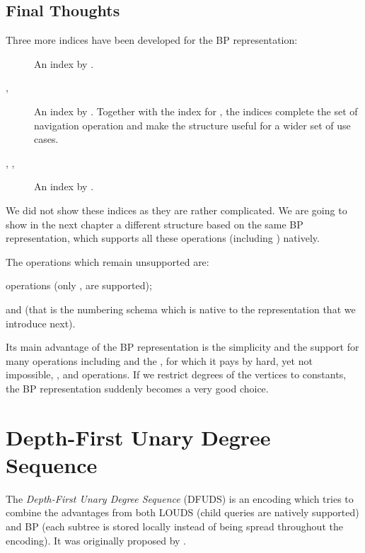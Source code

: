 \subsection{Final Thoughts}

Three more indices have been developed for the BP representation:
\begin{description}
	\item[\degree{}]
	An index by \cite{chiang2005orderly}.

	\item[\childRank{}, \childSelect{}]
	An index by \cite{lu2008balanced}.
	Together with the index for \degree{}, the indices complete the set of navigation operation and make the structure useful for a wider set of use cases.

	\item[\levelAncestor{}, \levelPrev{}, \levelNext{}]
	An index by \cite{munro2012succinct}.
\end{description}
We did not show these indices as they are rather complicated.
We are going to show in the next chapter a different structure based on the same BP representation, which supports all these operations (including \levelAny{}) natively.

The operations which remain unsupported are:
\begin{iteminline}
	\item \levelAny{} operations (only \levelPrev{}, \levelNext{} are supported);
	\item \dfudsRank{} and \dfudsSelect{} (that is the numbering schema which is native to the representation that we introduce next).
\end{iteminline}

Its main advantage of the BP representation is the simplicity and the support for many operations including \lca{} and the \dep{}, for which it pays by hard, yet not impossible, \childRank{}, \childSelect{} and \degree{} operations.
If we restrict degrees of the vertices to constants, the BP representation suddenly becomes a very good choice.

\section{Depth-First Unary Degree Sequence}

The \emph{Depth-First Unary Degree Sequence} (DFUDS) is an encoding which tries to combine the advantages from both LOUDS (child queries are natively supported) and BP (each subtree is stored locally instead of being spread throughout the encoding).
It was originally proposed by \cite{benoit1999representing}.

